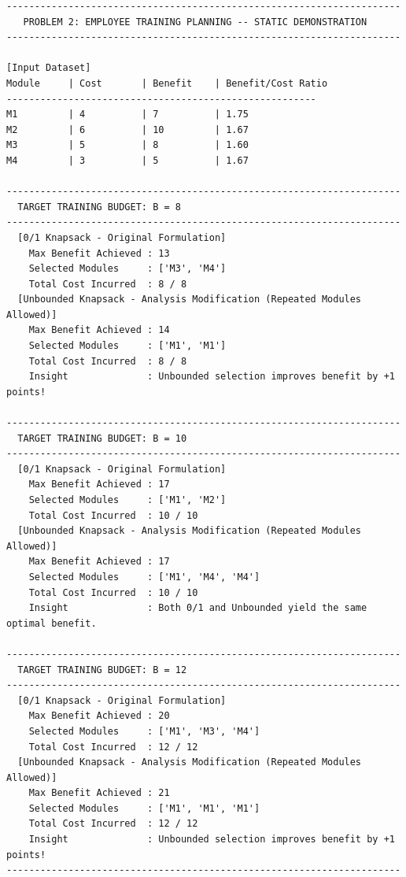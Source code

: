 \documentclass[12pt]{article}
\begin{document}
\begin{lstlisting}
----------------------------------------------------------------------
   PROBLEM 2: EMPLOYEE TRAINING PLANNING -- STATIC DEMONSTRATION
----------------------------------------------------------------------

[Input Dataset]
Module     | Cost       | Benefit    | Benefit/Cost Ratio
-------------------------------------------------------
M1         | 4          | 7          | 1.75              
M2         | 6          | 10         | 1.67              
M3         | 5          | 8          | 1.60              
M4         | 3          | 5          | 1.67              

----------------------------------------------------------------------
  TARGET TRAINING BUDGET: B = 8
----------------------------------------------------------------------
  [0/1 Knapsack - Original Formulation]
    Max Benefit Achieved : 13
    Selected Modules     : ['M3', 'M4']
    Total Cost Incurred  : 8 / 8
  [Unbounded Knapsack - Analysis Modification (Repeated Modules Allowed)]
    Max Benefit Achieved : 14
    Selected Modules     : ['M1', 'M1']
    Total Cost Incurred  : 8 / 8
    Insight              : Unbounded selection improves benefit by +1 points!

----------------------------------------------------------------------
  TARGET TRAINING BUDGET: B = 10
----------------------------------------------------------------------
  [0/1 Knapsack - Original Formulation]
    Max Benefit Achieved : 17
    Selected Modules     : ['M1', 'M2']
    Total Cost Incurred  : 10 / 10
  [Unbounded Knapsack - Analysis Modification (Repeated Modules Allowed)]
    Max Benefit Achieved : 17
    Selected Modules     : ['M1', 'M4', 'M4']
    Total Cost Incurred  : 10 / 10
    Insight              : Both 0/1 and Unbounded yield the same optimal benefit.

----------------------------------------------------------------------
  TARGET TRAINING BUDGET: B = 12
----------------------------------------------------------------------
  [0/1 Knapsack - Original Formulation]
    Max Benefit Achieved : 20
    Selected Modules     : ['M1', 'M3', 'M4']
    Total Cost Incurred  : 12 / 12
  [Unbounded Knapsack - Analysis Modification (Repeated Modules Allowed)]
    Max Benefit Achieved : 21
    Selected Modules     : ['M1', 'M1', 'M1']
    Total Cost Incurred  : 12 / 12
    Insight              : Unbounded selection improves benefit by +1 points!
----------------------------------------------------------------------
\end{lstlisting}
\end{document}
